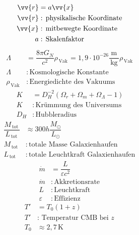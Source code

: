 \documentclass[a4paper,12pt]{article}
\numberwithin{equation}{section}
\begin{document}
\begin{align} 
        \vv{r}&=a\vv{x}\\
        \vv{r}&:\,\text{physikalische Koordinate}\,\nonumber \\
        \vv{x}&:\,\text{mitbewegte Koordinate}\,\nonumber \\
        a&:\,\text{Skalenfaktor}\,\nonumber 
\end{align} 
\begin{align} 
        \Lambda &=\dfrac{8\pi G_N}{c^2}\rho _{\,\text{Vak}\,}=1,9\cdot 10^{-26}\dfrac{\,\text{m}\,}{\,\text{kg}\,}\rho _{\,\text{Vak}\,}\\
        \Lambda &:\,\text{Kosmologische Konstante}\,\nonumber \\
        \rho _{\,\text{Vak}\,}&:\,\text{Energiedichte des Vakuums}\,\nonumber 
\end{align} 
\begin{align} 
        K&=D_H^{-2}\left(\Omega _r+\Omega _m+\Omega _\Lambda -1\right)\\
        K&:\,\text{Krümmung des Universums}\,\nonumber \\
        D_H&:\,\text{Hubbleradius}\,\nonumber 
\end{align} 
\begin{align} 
        \dfrac{M_{\,\text{tot}\,}}{L_{\,\text{tot}\,}}&\approx 300h \dfrac{M_\odot}{L_\odot}\\
        M_{\,\text{tot}\,}&:\,\text{totale Masse Galaxienhaufen}\,\nonumber \\
        L_{\,\text{tot}\,}&:\,\text{totale Leuchtkraft Galaxienhaufen}\,\nonumber 
\end{align} 
\begin{align} 
        \dot{m}&=\dfrac{L}{\varepsilon c^2}\\
        \dot{m}&:\,\text{Akkretionsrate}\,\nonumber \\
        L&:\,\text{Leuchtkraft}\,\nonumber \\
        \varepsilon &:\,\text{Effizienz}\,\nonumber 
\end{align} 
\begin{align} 
        T'&=T_0\left(1+z\right)\\
        T'&:\,\text{Temperatur CMB bei $z$}\,\nonumber \\
        T_0&\approx 2,7\,\text{K}\,\nonumber 
\end{align} 


\newpage

\end{document}
